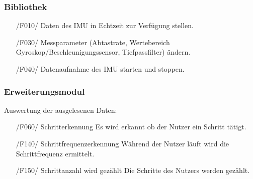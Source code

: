 \documentclass[a4paper,12pt]{article}
\begin{document}
    \subsubsection{Bibliothek}
    \begin{itemize}
      \item[/F010/] Daten des \Gls{IMU} in \Gls{Echtzeit} zur Verfügung stellen.
      \item[/F030/] Messparameter (Abtastrate, Wertebereich Gyroskop/Beschleunigungssensor, Tiefpassfilter) ändern. %
      \item[/F040/] Datenaufnahme des \Gls{IMU} starten und stoppen.
    \end{itemize}
    \subsubsection{Erweiterungsmodul}
     Auswertung der ausgelesenen Daten:
     \begin{itemize}
      \item[/F060/] \textsf{Schritterkennung} Es wird erkannt ob der Nutzer ein Schritt tätigt.
      \item[/F140/] \textsf{Schrittfrequenzerkennung} Während der Nutzer läuft wird die Schrittfrequenz ermittelt.
      \item[/F150/] \textsf{Schrittanzahl wird gezählt} Die Schritte des Nutzers werden gezählt.
    \end{itemize}
\end{document}
